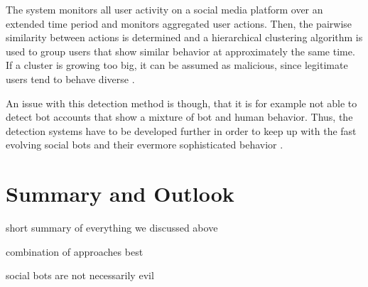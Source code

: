 The system monitors all user activity on a social media platform over an extended time period and monitors aggregated user actions. Then, the pairwise similarity between actions is determined and a hierarchical clustering algorithm is used to group users that show similar behavior at approximately the same time. If a cluster is growing too big, it can be assumed as malicious, since legitimate users tend to behave diverse \cite{synchrotrap}.

An issue with this detection method is though, that it is for example not able to detect bot accounts that show a mixture of bot and human behavior. Thus, the detection systems have to be developed further in order to keep up with the fast evolving social bots and their evermore sophisticated behavior \cite{ferrara15}.


\section{Summary and Outlook}

short summary of everything we discussed above

combination of approaches best

social bots are not necessarily evil


























\newpage